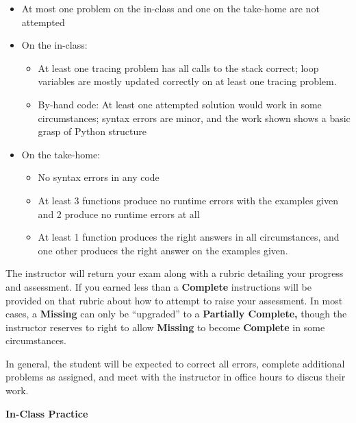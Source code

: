 \documentclass{article}
\newcommand{\vs}{\vspace{0.1in}}
\begin{document}
\begin{itemize}
\item	At most one problem on the in-class and one on the take-home are not attempted
\item	On the in-class:
\begin{itemize}
\item  At least one tracing problem has all calls to the stack correct; loop variables are mostly updated correctly on at least one tracing problem.
\item  By-hand code: At least one attempted solution would work in some circumstances; syntax errors are minor, and the work shown shows a basic grasp of Python structure
\end{itemize}
\item	On the take-home:
\begin{itemize}
\item	No syntax errors in any code
\item	At least 3 functions produce no runtime errors with the examples given and 2 produce no runtime errors at all
\item	At least 1 function produces the right answers in all circumstances, and one other produces the right answer on the examples given.
\end{itemize}
\end{itemize}

The instructor will return your exam along with a rubric detailing your progress and assessment. If you earned less than a \textbf{Complete} instructions will be provided on that rubric about how to attempt to raise your assessment. In most cases, a \textbf{Missing} can only be ``upgraded'' to a \textbf{Partially Complete,} though the instructor reserves to right to allow \textbf{Missing} to become \textbf{Complete} in some circumstances.

\vs

In general, the student will be expected to correct all errors, complete additional problems as assigned, and meet with the instructor in office hours to discus their work.


\newpage


\textbf{In-Class Practice}
\end{document}

